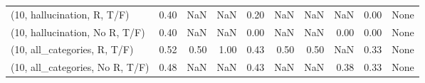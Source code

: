 \begin{table*}[h!]
\begin{adjustbox}{width=2\columnwidth,center}
\begin{tabular}{lrrr|rrr|rrr}
(10, hallucination, R, T/F)           &                      0.40 &                   NaN &                       NaN &                          0.20 &                       NaN &                           NaN &                                    NaN &                               0.00 &                                  None \\
(10, hallucination, No R, T/F)        &                      0.40 &                   NaN &                       NaN &                          0.00 &                       NaN &                           NaN &                                   0.00 &                               0.00 &                                  None \\
(10, all\_categories, R, T/F)          &                      0.52 &                  0.50 &                      1.00 &                          0.43 &                      0.50 &                          0.50 &                                    NaN &                               0.33 &                                  None \\
(10, all\_categories, No R, T/F)       &                      0.48 &                   NaN &                       NaN &                          0.43 &                       NaN &                           NaN &                                   0.38 &                               0.33 &                                  None \\




\end{tabular}
\end{adjustbox}
\end{table*}
